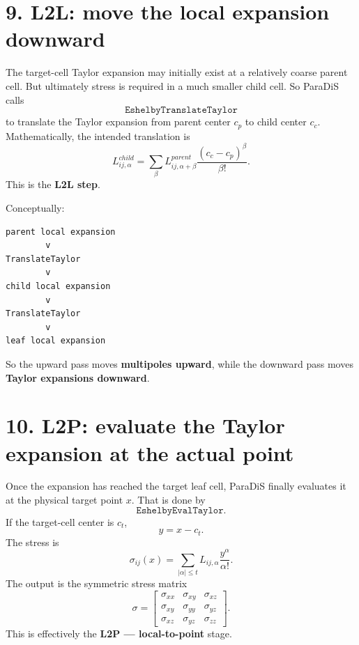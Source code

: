 \documentclass[11pt,a4paper]{article}
\begin{document}
\section*{9. L2L: move the local expansion downward}
The target-cell Taylor expansion may initially exist at a relatively coarse parent cell.
But ultimately stress is required in a much smaller child cell.
So ParaDiS calls
\[\boxed{\texttt{EshelbyTranslateTaylor}}\]
to translate the Taylor expansion from parent center \(c_p\) to child center \(c_c\).
Mathematically, the intended translation is
\[\boxed{L^{child}_{ij,\alpha}=\sum_\beta L^{parent}_{ij,\alpha+\beta}\frac{(c_c-c_p)^\beta}{\beta!}.}\]
This is the \textbf{L2L step}.

Conceptually:
\begin{Verbatim}[fontsize=\small]
parent local expansion
        v
TranslateTaylor
        v
child local expansion
        v
TranslateTaylor
        v
leaf local expansion
\end{Verbatim}
So the upward pass moves \textbf{multipoles upward}, while the downward pass moves \textbf{Taylor expansions downward}.

\section*{10. L2P: evaluate the Taylor expansion at the actual point}
Once the expansion has reached the target leaf cell, ParaDiS finally evaluates it at the physical target point \(x\).
That is done by
\[\boxed{\texttt{EshelbyEvalTaylor}}.\]
If the target-cell center is \(c_t\),
\[y=x-c_t.\]
The stress is
\[\boxed{\sigma_{ij}(x)=\sum_{|\alpha|\le t}L_{ij,\alpha}\frac{y^\alpha}{\alpha!}.}\]
The output is the symmetric stress matrix
\[\boxed{\sigma=\begin{bmatrix}\sigma_{xx}&\sigma_{xy}&\sigma_{xz}\\\sigma_{xy}&\sigma_{yy}&\sigma_{yz}\\\sigma_{xz}&\sigma_{yz}&\sigma_{zz}\end{bmatrix}.}\]
This is effectively the \textbf{L2P --- local-to-point} stage.
\end{document}
